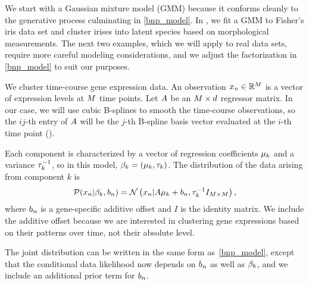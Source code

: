 We start with a Gaussian mixture model (GMM)
because it conforms cleanly to the
generative process culminating in \eqref{bnp_model}.
In , we fit a GMM to Fisher's iris data set
\citep{anderson:1936:iris, fisher:1936:iris} and
cluster irises into latent species based on morphological measurements.
The next two examples, which we will apply to real data sets,
require more careful modeling considerations,
and we adjust the factorization in \eqref{bnp_model} to suit our purposes.


\begin{ex}

We cluster time-course gene expression data.
An observation $x_n\in\mathbb{R}^M$ is a vector of
expression levels at $M$
time points.
Let $A$ be an $M \times d$ regressor matrix.
In our case, we will use cubic B-splines to smooth the time-course observations,
so the $ij$-th entry of $A$
will be the $j$-th B-spline basis vector evaluated at the
$i$-th time point ().

Each component is characterized by a vector of regression coefficients
$\mu_k$ and a variance $\tau^{-1}_k$, so
in this model, $\beta_k = (\mu_k, \tau_k)$.
The distribution of the data arising from component $k$ is
\begin{align*}
\mathcal{P}(x_n | \beta_k, b_n) =
\mathcal{N}\left(x_n | A\mu_k + b_n,
\tau_k^{-1}I_{M \times M}\right),
\end{align*}
%
where $b_{n}$ is a gene-specific additive offset and $I$ is the identity matrix.
We include the additive offset because we
are interested in clustering gene expressions based on their patterns over time,
not their absolute level.

The joint distribution can be written in the same form as~\eqref{bnp_model},
except that the conditional data likelihood now depends on $b_n$ as well as $\beta_k$,
and we include an additional prior term for $b_n$.
%
\end{ex}

